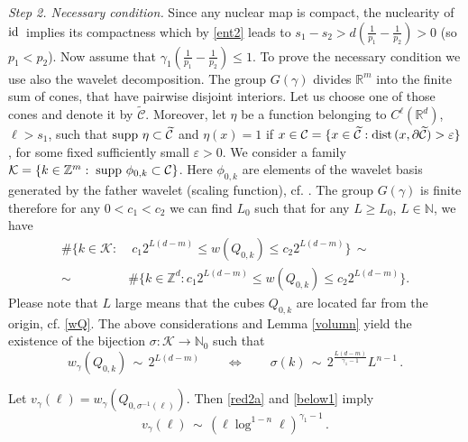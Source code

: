 \documentclass[12pt]{article}
\def\supp{\mathop{\rm supp \,}\nolimits}
\def\dist{\mathop{\rm dist \,}\nolimits}
\def\id{\mathop{\rm id \,}\nolimits}
\newcommand{\Rd}{{\mathbb R}^{d}}
\newcommand{\R}{{\mathbb R}}
\newcommand{\N}{{\mathbb N}}
\newcommand{\Z}{\mathbb Z}
\begin{document}
{\em Step 2.  Necessary condition.} 
Since any nuclear map is compact, the nuclearity of $\id$ implies its compactness which by \eqref{ent2} leads to $s_1 - s_2> d(\frac{1}{p_1}- \frac{1}{p_2})>0$ (so $p_1<p_2$).
Now assume that $\gamma_1(\frac{1}{p_1}- \frac{1}{p_2})\leq1$.
To prove the necessary condition we use also the wavelet decomposition. The group $G(\gamma)$ divides $\R^m$ into the finite sum of cones, that have pairwise disjoint interiors. Let us choose one of those cones and denote it by $\widetilde{\mathcal{C}}$. 
Moreover, let $\eta$ be a function belonging to $C^\ell(\Rd)$, $\ell>s_1$, such that $\supp \eta \subset \widetilde{\mathcal{C}}$ and $\eta(x)=1$ if $x\in {\mathcal{C}} = \{x\in \widetilde{\mathcal{C}}: \dist (x, \partial\widetilde{\mathcal{C}})>\varepsilon\}$, for some fixed sufficiently small $\varepsilon>0$. 
We consider a family  $\mathcal{K} = \{k\in \Z^m:\; \supp \phi_{0,k} \subset \mathcal{C}\}$. Here  $\phi_{0,k}$ are elements of the wavelet basis generated by the father wavelet (scaling function), cf. \cite[Appendix]{DS}.  The group $G(\gamma)$ is finite therefore for any $0<c_1<c_2$ we can find   $L_0$ such that for any $L\ge L_0$, $L\in \N$, we have 
\begin{align}\label{below1}
\#\{k\in \mathcal{K}: & \;c_1 2^{L(d-m)}\le w(Q_{0,k})\le c_2 2^{L(d-m)} \} \, \sim\,  \\ 
\sim\, &  \#\{k\in \Z^d:   c_1 2^{L(d-m)}\le w(Q_{0,k})\le c_2 2^{L(d-m)} \} .  \nonumber
\end{align}   
Please note that $L$ large means that the cubes $Q_{0,k}$ are located far from the origin, cf. \eqref{wQ}. The above considerations and Lemma \ref{volumn} yield  the existence of the bijection $\sigma: \mathcal{K} \rightarrow \N_0$ such that 
\begin{equation}\label{red1bis}\nonumber
w_\gamma (Q_{0,k}) \,\sim\,  2^{L(d-m)} \qquad \Longleftrightarrow\qquad  \sigma(k)\, \sim \, 2^{\frac{L(d-m)}{\gamma_1-1}}L^{n-1} \, .
\end{equation}

Let $v_{\gamma}(\ell) =  w_\gamma (Q_{0,\sigma^{-1}(\ell)})$.  Then \eqref{red2a} and \eqref{below1} imply
\begin{equation}\label{below1a}
v_\gamma(\ell)  
\, \sim \, (\ell\log^{1-n}\ell)^{\gamma_1-1}\, .
\end{equation}  
\end{document}
